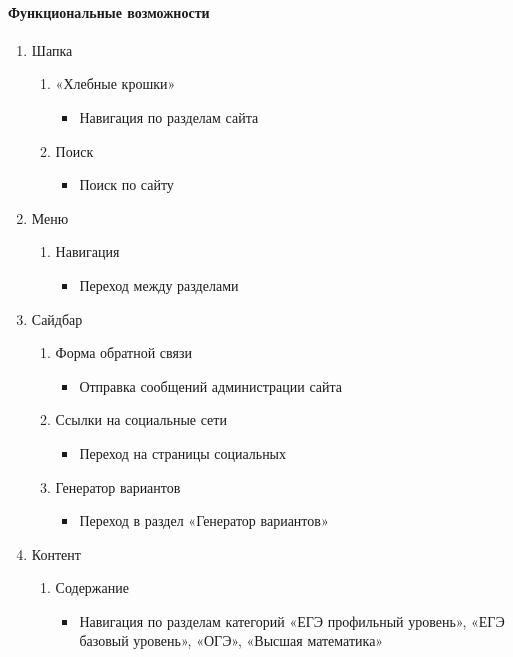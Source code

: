 \paragraph{Функциональные возможности}
\begin{enumerate}

	\item Шапка
	\begin{enumerate}
		\item «Хлебные крошки»
		\begin{itemize}
			\item Навигация по разделам сайта
		\end{itemize}
		\item Поиск
		\begin{itemize}
			\item Поиск по сайту
		\end{itemize}
	\end{enumerate}

	\item Меню
	\begin{enumerate}
		\item Навигация
		\begin{itemize}
			\item Переход между разделами
		\end{itemize}
	\end{enumerate}

	\item Сайдбар
	\begin{enumerate}
		\item Форма обратной связи
		\begin{itemize}
			\item Отправка сообщений администрации сайта
		\end{itemize}

		\item Ссылки на социальные сети
		\begin{itemize}
			\item Переход на страницы социальных 
		\end{itemize}

		\item Генератор вариантов
		\begin{itemize}
			\item Переход в раздел «Генератор вариантов»
		\end{itemize}
	\end{enumerate}

	\item Контент
	\begin{enumerate}
		\item Содержание
		\begin{itemize}
			\item Навигация по разделам категорий «ЕГЭ профильный уровень», «ЕГЭ базовый уровень», «ОГЭ», «Высшая математика»
		\end{itemize}
	\end{enumerate}


\end{enumerate}
